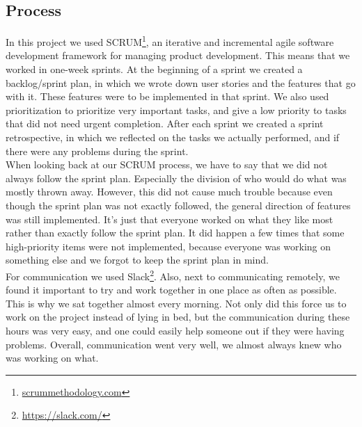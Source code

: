 \subsection{Process}
In this project we used SCRUM\footnote{\url{scrummethodology.com}}, an iterative and incremental agile software development framework for managing product development. This means that we worked in one-week sprints. At the beginning of a sprint we created a backlog/sprint plan, in which we wrote down user stories and the features that go with it. These features were to be implemented in that sprint. We also used prioritization to prioritize very important tasks, and give a low priority to tasks that did not need urgent completion. After each sprint we created a sprint retrospective, in which we reflected on the tasks we actually performed, and if there were any problems during the sprint.\\
When looking back at our SCRUM process, we have to say that we did not always follow the sprint plan. Especially the division of who would do what was mostly thrown away. However, this did not cause much trouble because even though the sprint plan was not exactly followed, the general direction of features was still implemented. It's just that everyone worked on what they like most rather than exactly follow the sprint plan. It did happen a few times that some high-priority items were not implemented, because everyone was working on something else and we forgot to keep the sprint plan in mind.\\
For communication we used Slack\footnote{\url{https://slack.com/}}. Also, next to communicating remotely, we found it important to try and work together in one place as often as possible. This is why we sat together almost every morning. Not only did this force us to work on the project instead of lying in bed, but the communication during these hours was very easy, and one could easily help someone out if they were having problems. Overall, communication went very well, we almost always knew who was working on what.
